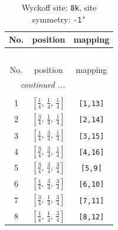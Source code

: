\documentclass[fleqn,8pt]{jsarticle}
\begin{document}
\renewcommand{\arraystretch}{1.2}
\begin{longtable}{ccc}
\caption{Wyckoff site: {\tt 8k}, site symmetry: {\tt -1'}}
 \\
 \hline \hline
No. & position & mapping \\ \hline \endfirsthead

\multicolumn{2}{l}{\tablename\ \thetable{}} \\
 \hline \hline
No. & position & mapping \\ \hline \endhead

 \hline \hline
\multicolumn{2}{r}{\footnotesize\it continued ...} \\ \endfoot

 \hline \hline
\multicolumn{2}{r}{} \\ \endlastfoot

1 & $\left[ \frac{1}{4},\, \frac{1}{4},\, \frac{1}{4} \right]$ & {\tt [1,13]} \\ \hline
2 & $\left[ \frac{3}{4},\, \frac{1}{4},\, \frac{1}{4} \right]$ & {\tt [2,14]} \\ \hline
3 & $\left[ \frac{1}{4},\, \frac{3}{4},\, \frac{1}{4} \right]$ & {\tt [3,15]} \\ \hline
4 & $\left[ \frac{3}{4},\, \frac{3}{4},\, \frac{1}{4} \right]$ & {\tt [4,16]} \\ \hline
5 & $\left[ \frac{3}{4},\, \frac{3}{4},\, \frac{3}{4} \right]$ & {\tt [5,9]} \\ \hline
6 & $\left[ \frac{1}{4},\, \frac{3}{4},\, \frac{3}{4} \right]$ & {\tt [6,10]} \\ \hline
7 & $\left[ \frac{3}{4},\, \frac{1}{4},\, \frac{3}{4} \right]$ & {\tt [7,11]} \\ \hline
8 & $\left[ \frac{1}{4},\, \frac{1}{4},\, \frac{3}{4} \right]$ & {\tt [8,12]} \\
\end{longtable}
\renewcommand{\arraystretch}{1.2}
\end{document}

